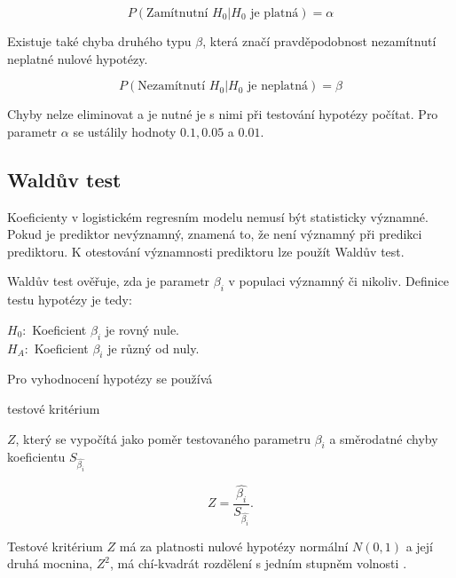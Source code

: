 \begin{equation}
    P(\text{Zamítnutní }H_0 | H_0\text{ je platná}) = \alpha
\end{equation}

Existuje také chyba druhého typu $\beta$, která značí pravděpodobnost nezamítnutí neplatné nulové hypotézy.

\begin{equation}
    P(\text{Nezamítnutí }H_0 | H_0\text{ je neplatná}) = \beta
\end{equation}

Chyby nelze eliminovat a je nutné je s nimi při testování hypotézy počítat. Pro parametr $\alpha$ se ustálily hodnoty $0.1, 0.05$ a $0.01$.


\subsection{Waldův test}
Koeficienty v logistickém regresním modelu nemusí být statisticky významné. Pokud je prediktor nevýznamný, znamená to, že není významný při predikci prediktoru.
K otestování významnosti prediktoru lze použít Waldův test.

Waldův test ověřuje, zda je parametr $\beta_i$ v populaci významný či nikoliv. Definice testu hypotézy je tedy:

$H_0:$ Koeficient $\beta_i$ je rovný nule. \\
$H_A:$ Koeficient $\beta_i$ je různý od nuly.

Pro vyhodnocení hypotézy se používá

testové kritérium

$Z$, který se vypočítá jako poměr testovaného parametru $\beta_i$
a směrodatné chyby koeficientu $S_{\hat{\beta_i}}$

\begin{equation}
    Z = \frac{\hat{\beta_i}}{S_{\hat{\beta_i}}}.
\end{equation}


Testové kritérium
$Z$ má za platnosti nulové hypotézy normální $N(0, 1)$ a její druhá mocnina, $Z^2$, má chí-kvadrát rozdělení s jedním stupněm volnosti \cite{kleinbaum_logistic_2010}.

